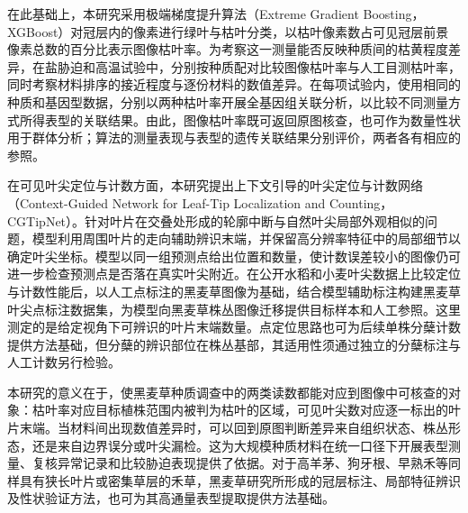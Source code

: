 在此基础上，本研究采用极端梯度提升算法（Extreme Gradient Boosting，XGBoost）对冠层内的像素进行绿叶与枯叶分类，以枯叶像素数占可见冠层前景像素总数的百分比表示图像枯叶率。为考察这一测量能否反映种质间的枯黄程度差异，在盐胁迫和高温试验中，分别按种质配对比较图像枯叶率与人工目测枯叶率，同时考察材料排序的接近程度与逐份材料的数值差异。在每项试验内，使用相同的种质和基因型数据，分别以两种枯叶率开展全基因组关联分析，以比较不同测量方式所得表型的关联结果。由此，图像枯叶率既可返回原图核查，也可作为数量性状用于群体分析；算法的测量表现与表型的遗传关联结果分别评价，两者各有相应的参照。

在可见叶尖定位与计数方面，本研究提出上下文引导的叶尖定位与计数网络（Context-Guided Network for Leaf-Tip Localization and Counting，CGTipNet）。针对叶片在交叠处形成的轮廓中断与自然叶尖局部外观相似的问题，模型利用周围叶片的走向辅助辨识末端，并保留高分辨率特征中的局部细节以确定叶尖坐标。模型以同一组预测点给出位置和数量，使计数误差较小的图像仍可进一步检查预测点是否落在真实叶尖附近。在公开水稻和小麦叶尖数据上比较定位与计数性能后，以人工点标注的黑麦草图像为基础，结合模型辅助标注构建黑麦草叶尖点标注数据集，为模型向黑麦草株丛图像迁移提供目标样本和人工参照。这里测定的是给定视角下可辨识的叶片末端数量。点定位思路也可为后续单株分蘖计数提供方法基础，但分蘖的辨识部位在株丛基部，其适用性须通过独立的分蘖标注与人工计数另行检验。

本研究的意义在于，使黑麦草种质调查中的两类读数都能对应到图像中可核查的对象：枯叶率对应目标植株范围内被判为枯叶的区域，可见叶尖数对应逐一标出的叶片末端。当材料间出现数值差异时，可以回到原图判断差异来自组织状态、株丛形态，还是来自边界误分或叶尖漏检。这为大规模种质材料在统一口径下开展表型测量、复核异常记录和比较胁迫表现提供了依据。对于高羊茅、狗牙根、早熟禾等同样具有狭长叶片或密集草层的禾草，黑麦草研究所形成的冠层标注、局部特征辨识及性状验证方法，也可为其高通量表型提取提供方法基础。